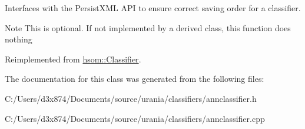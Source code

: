 \-Interfaces with the \-Persist\-X\-M\-L \-A\-P\-I to ensure correct saving order for a classifier. 

\begin{DoxyNote}{\-Note}
\-This is optional. \-If not implemented by a derived class, this function does nothing 
\end{DoxyNote}


\-Reimplemented from \hyperlink{classhsom_1_1_classifier_a44fd60ca14d06f5f3889e3d49573cd75}{hsom\-::\-Classifier}.



\-The documentation for this class was generated from the following files\-:\begin{DoxyCompactItemize}
\item 
\-C\-:/\-Users/d3x874/\-Documents/source/urania/classifiers/annclassifier.\-h\item 
\-C\-:/\-Users/d3x874/\-Documents/source/urania/classifiers/annclassifier.\-cpp\end{DoxyCompactItemize}
